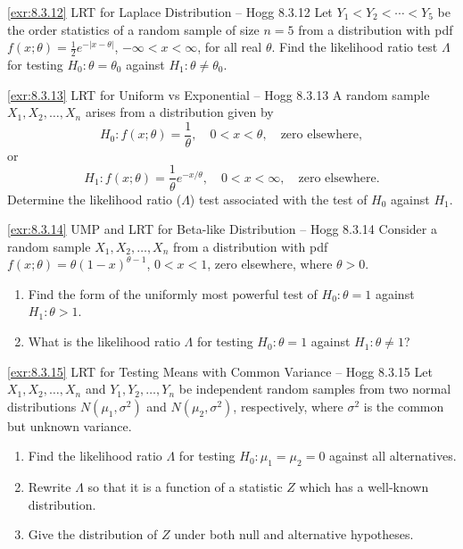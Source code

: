\begin{exercise}{\ref{exr:8.3.12} LRT for Laplace Distribution -- Hogg 8.3.12}\label{exr:8.3.12}
Let $Y_1 < Y_2 < \cdots < Y_5$ be the order statistics of a random sample of size $n = 5$ from a distribution with pdf $f(x; \theta) = \frac{1}{2}e^{-|x-\theta|}$, $-\infty < x < \infty$, for all real $\theta$. Find the likelihood ratio test $\Lambda$ for testing $H_0: \theta = \theta_0$ against $H_1: \theta \neq \theta_0$.
\end{exercise}

\begin{exercise}{\ref{exr:8.3.13} LRT for Uniform vs Exponential -- Hogg 8.3.13}\label{exr:8.3.13}
A random sample $X_1, X_2, \ldots, X_n$ arises from a distribution given by
\[
H_0: f(x; \theta) = \frac{1}{\theta}, \quad 0 < x < \theta, \quad \text{zero elsewhere},
\]
or
\[
H_1: f(x; \theta) = \frac{1}{\theta}e^{-x/\theta}, \quad 0 < x < \infty, \quad \text{zero elsewhere}.
\]
Determine the likelihood ratio ($\Lambda$) test associated with the test of $H_0$ against $H_1$.
\end{exercise}

\begin{exercise}{\ref{exr:8.3.14} UMP and LRT for Beta-like Distribution -- Hogg 8.3.14}\label{exr:8.3.14}
Consider a random sample $X_1, X_2, \ldots, X_n$ from a distribution with pdf $f(x; \theta) = \theta(1-x)^{\theta-1}$, $0 < x < 1$, zero elsewhere, where $\theta > 0$.
\begin{enumerate}
\item[(a)] Find the form of the uniformly most powerful test of $H_0: \theta = 1$ against $H_1: \theta > 1$.
\item[(b)] What is the likelihood ratio $\Lambda$ for testing $H_0: \theta = 1$ against $H_1: \theta \neq 1$?
\end{enumerate}
\end{exercise}

\begin{exercise}{\ref{exr:8.3.15} LRT for Testing Means with Common Variance -- Hogg 8.3.15}\label{exr:8.3.15}
Let $X_1, X_2, \ldots, X_n$ and $Y_1, Y_2, \ldots, Y_n$ be independent random samples from two normal distributions $N(\mu_1, \sigma^2)$ and $N(\mu_2, \sigma^2)$, respectively, where $\sigma^2$ is the common but unknown variance.
\begin{enumerate}
\item[(a)] Find the likelihood ratio $\Lambda$ for testing $H_0: \mu_1 = \mu_2 = 0$ against all alternatives.
\item[(b)] Rewrite $\Lambda$ so that it is a function of a statistic $Z$ which has a well-known distribution.
\item[(c)] Give the distribution of $Z$ under both null and alternative hypotheses.
\end{enumerate}
\end{exercise}

